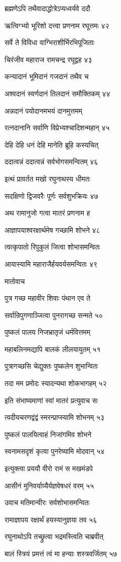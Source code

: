 ब्रह्मणेऽपि तथैवादाद्धोत्रेऽप्यध्वर्यवे ददौ

ऋत्विग्भ्यो भूरिशो दत्त्वा प्रणनाम रघूत्तमः ४२

सर्वे ते विविधा वाग्भिराशीर्भिरभिपूजिताः

चिरंजीव महाराज रामचन्द्र रघूद्वह ४३

कन्यादानं भूमिदानं गजदानं तथैव च

अश्वदानं स्वर्णदानं तिलदानं समौक्तिकम् ४४

अन्नदानं पयोदानमभयं दानमुत्तमम्

रत्नदानानि सर्वाणि विप्रेभ्यश्चादिशन्महान् ४५

देहि देहि धनं देहि मानेति ब्रूहि कस्यचित्

ददात्वन्नं ददात्वन्नं सर्वभोगसमन्वितम् ४६

इत्थं प्रावर्तत मखो रघुनाथस्य धीमतः

सदक्षिणो द्विजवरैः पूर्णः सर्वशुभक्रियः ४७

अथ रामानुजो गत्वा मातरं प्रणनाम ह

आज्ञापयाश्वरक्षार्थमेष गच्छामि शोभने ४८

त्वत्कृपातो रिपुकुलं जित्वा शोभासमन्वितः

आयास्यामि महाराजैर्हयवर्यसमन्वितः ४९

मातोवाच

पुत्र गच्छ महावीर शिवाः पंथान एव ते

सर्वान्रिपुगणाञ्जित्वा पुनरागच्छ सन्मते ५०

पुष्कलं पालय निजभ्रातृजं धर्मवित्तमम्

महाबलिनमद्यापि बालकं लीलयायुतम् ५१

पुत्रागच्छसि चेद्युक्तः पुष्कलेन शुभान्वितः

तदा मम प्रमोदः स्यादन्यथा शोकभागहम् ५२

इति संभाष्यमाणां स्वां मातरं प्रत्युवाच सः

त्वदीयचरणद्वंद्वं स्मरन्प्राप्स्यामि शोभनम् ५३

पुष्कलं पालयित्वाहं निजांगमिव शोभने

स्वनामसदृशं कृत्वा पुनरेष्यामि मोदवान् ५४

इत्युक्त्वा प्रययौ वीरो रामं स मखमंडपे

आसीनं मुनिवर्याग्र्यैर्यज्ञवेषधरं वरम् ५५

उवाच मतिमान्वीरः सर्वशोभासमन्वितः

रामाज्ञापय रक्षार्थं हयस्यानुज्ञया तव ५६

रघुनाथोऽपि तच्छ्रुत्वा भद्रमस्त्विति चाब्रवीत्

बालं स्त्रियं प्रमत्तं त्वं मा हन्याः शस्त्रवर्जितम् ५७

